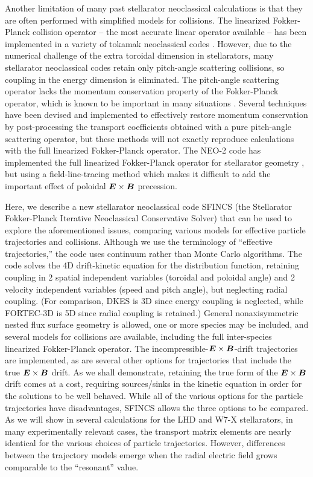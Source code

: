 \documentclass[12pt,superscriptaddress]{revtex4}
\newcommand{\vect}[1]{\mbox{\boldmath $#1$}}
\begin{document}
Another limitation of many past stellarator neoclassical calculations
is that they are often performed with simplified models for collisions.
The linearized Fokker-Planck collision operator -- the most accurate linear operator available -- 
has been implemented in a variety of 
tokamak neoclassical codes \cite{Sauter0, Sauter, WongChan, NEOFP, speedGrids}.
However, due to the numerical challenge of the extra toroidal dimension in stellarators, 
many stellarator neoclassical codes retain only pitch-angle scattering collisions,
so coupling in the energy dimension is eliminated.
The pitch-angle scattering operator
lacks the momentum conservation property of the Fokker-Planck operator,
which is known to be important in many situations \cite{Briesemeister}.
Several techniques have been devised and implemented \cite{Taguchi2, SugamaNishimura, Maassberg, PENTA}
to effectively restore momentum conservation by post-processing
the transport coefficients obtained with a pure pitch-angle scattering operator,
but these methods will not exactly reproduce calculations with the full linearized Fokker-Planck operator.
The NEO-2 code has implemented the full linearized Fokker-Planck operator for
stellarator geometry \cite{Kernbichler1}, but using a field-line-tracing method
which makes it difficult to add the important effect of poloidal $\vect{E}\times\vect{B}$ precession.

Here, we describe a new stellarator neoclassical code
SFINCS (the Stellarator Fokker-Planck Iterative Neoclassical Conservative Solver)
that can be used to explore the aforementioned issues,
comparing various models for effective particle trajectories and collisions.
Although we use the terminology of ``effective trajectories,'' the code
uses continuum rather than Monte Carlo algorithms.
The code solves the 4D drift-kinetic equation for the distribution function,
retaining coupling in 2 spatial independent variables (toroidal and poloidal angle)
and 2 velocity independent variables (speed and pitch angle),
but neglecting radial coupling.
(For comparison, DKES \cite{DKES1, DKES2} is 3D since energy coupling is neglected, 
while FORTEC-3D \cite{FORTEC_PFR, FORTEC_CPC} is 5D since
radial coupling is retained.)
General nonaxisymmetric nested flux surface geometry is allowed,
one or more species may be included, and several models for collisions are available,
including the full inter-species linearized Fokker-Planck operator.
The incompressible-$\vect{E}\times\vect{B}$-drift trajectories are implemented,
as are several other options for trajectories that include the true $\vect{E}\times\vect{B}$ drift.
As we shall demonstrate, retaining the true form of the $\vect{E}\times\vect{B}$
drift comes at a cost, requiring sources/sinks in the kinetic equation
in order for the solutions to be well behaved.
While all of the various options for the particle trajectories have disadvantages,
SFINCS allows the three options to be compared.
As we will show in several calculations for the LHD and W7-X stellarators,
in many experimentally relevant cases,
the transport matrix elements are nearly identical for the various choices of particle trajectories.
However, differences between the trajectory models emerge when the radial electric field
grows comparable to the ``resonant'' value.
\end{document}
